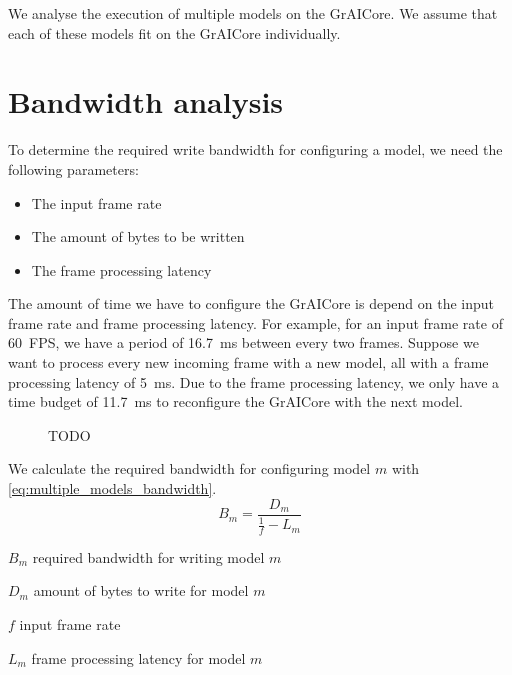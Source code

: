 We analyse the execution of multiple models on the GrAICore.
We assume that each of these models fit on the GrAICore individually.

\section{Bandwidth analysis}

To determine the required write bandwidth for configuring a model, we need the following parameters:
\begin{itemize}
    \item The input frame rate
    \item The amount of bytes to be written
    \item The frame processing latency
\end{itemize}

The amount of time we have to configure the GrAICore is depend on the input frame rate and frame processing latency.
For example, for an input frame rate of \SI{60}{FPS}, we have a period of \SI{16.7}{ms} between every two frames.
Suppose we want to process every new incoming frame with a new model, all with a frame processing latency of \SI{5}{ms}. 
Due to the frame processing latency, we only have a time budget of \SI{11.7}{ms} to reconfigure the GrAICore with the next model.

\begin{figure}[htbp]
    \centering
    
    \caption{TODO}
    \label{fig:reconfig_time_line_ex3}
\end{figure}

We calculate the required bandwidth for configuring model $m$ with \cref{eq:multiple_models_bandwidth}.
\begin{equation}
    B_m = \frac{D_m}{\frac{1}{f} - L_m}
    \label{eq:multiple_models_bandwidth}
\end{equation}

\begin{eqexpl}[15mm]
    \item{$B_m$} required bandwidth for writing model $m$
    \item{$D_m$} amount of bytes to write for model $m$
    \item{$f$} input frame rate
    \item{$L_m$} frame processing latency for model $m$
\end{eqexpl}


